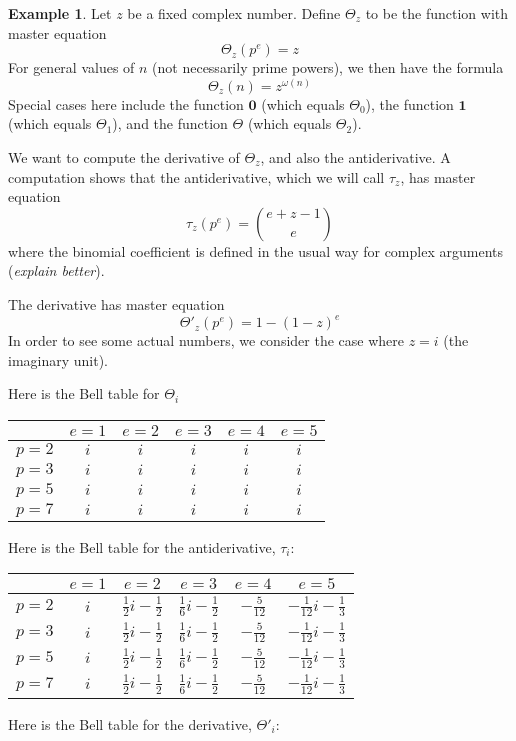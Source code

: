 \documentclass[a4paper]{article}
\theoremstyle{definition}
\newtheorem{example}{Example}[section]
\theoremstyle{remark}
\begin{document}
\begin{example}
Let $z$ be a fixed complex number. Define $\Theta_z$ to be the function with master equation 
$$\Theta_z(p^e) = z$$
For general values of $n$ (not necessarily prime powers), we then have the formula
$$ \Theta_z(n) = z^{\omega(n)}  $$ 
Special cases here include the function $\mathbf{0}$ (which equals $\Theta_0$), the function $\mathbf{1}$ (which equals $\Theta_1$), and the function $\Theta$ (which equals $\Theta_2$).

We want to compute the derivative of $\Theta_z$, and also the antiderivative. A computation shows that the antiderivative, which we will call $\tau_z$, has master equation
$$ \tau_z(p^e) = \binom{e+z-1}{e}     $$
where the binomial coefficient is defined in the usual way for complex arguments (\emph{explain better}).

The derivative has master equation
$$ \Theta'_{z} (p^e) = 1- (1-z)^e  $$
In order to see some actual numbers, we consider the case where $z=i$ (the imaginary unit). 

Here is the Bell table for $\Theta_i$
\vskip10pt
\begin{center}
\begin{tabular}{| l | | c | c | c | c | c |}
\hline
& $e = 1$ & $e = 2$ & $e = 3$ & $e = 4$ & $e = 5$\\
\hline
\hline
$p = 2$ & $i$ & $i$ & $i$ & $i$ & $i$ \\
\hline
$p = 3$ & $i$ & $i$ & $i$ & $i$ & $i$ \\
\hline
$p = 5$ & $i$ & $i$ & $i$ & $i$ & $i$ \\
\hline
$p = 7$ & $i$ & $i$ & $i$ & $i$ & $i$ \\
\hline
\end{tabular}
\end{center}

Here is the Bell table for the antiderivative, $\tau_i$:
\vskip10pt
\begin{center}
\begin{tabular}{| l | | c | c | c | c | c |}
\hline
& $e = 1$ & $e = 2$ & $e = 3$ & $e = 4$ & $e = 5$\\
\hline
\hline
$p = 2$ & $i$ & $\frac{1}{2} i - \frac{1}{2}$ & $\frac{1}{6} i - \frac{1}{2}$ & $-\frac{5}{12}$ & $-\frac{1}{12} i - \frac{1}{3}$ \\
\hline
$p = 3$ & $i$ & $\frac{1}{2} i - \frac{1}{2}$ & $\frac{1}{6} i - \frac{1}{2}$ & $-\frac{5}{12}$ & $-\frac{1}{12} i - \frac{1}{3}$ \\
\hline
$p = 5$ & $i$ & $\frac{1}{2} i - \frac{1}{2}$ & $\frac{1}{6} i - \frac{1}{2}$ & $-\frac{5}{12}$ & $-\frac{1}{12} i - \frac{1}{3}$ \\
\hline
$p = 7$ & $i$ & $\frac{1}{2} i - \frac{1}{2}$ & $\frac{1}{6} i - \frac{1}{2}$ & $-\frac{5}{12}$ & $-\frac{1}{12} i - \frac{1}{3}$ \\
\hline
\end{tabular}
\end{center}
\vskip10pt
Here is the Bell table for the derivative, $\Theta'_i$:
\vskip10pt
\begin{center}


\end{center}
\end{example}
\end{document}
